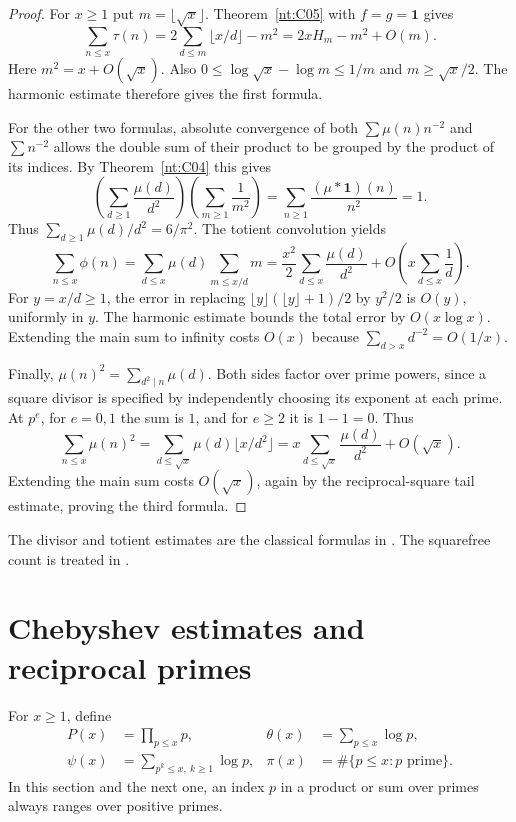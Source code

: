 \documentclass[11pt,oneside,openany]{book}
\theoremstyle{plain}
\theoremstyle{definition}
\theoremstyle{remark}
\begin{document}
\begin{proof}
For \(x\ge1\) put \(m=\lfloor\sqrt{x}\rfloor\). Theorem~\ref{nt:C05}
with \(f=g=\mathbf{1}\) gives
\[
 \sum_{n\le x}\tau(n)=2\sum_{d\le m}\lfloor x/d\rfloor-m^2
                  =2xH_m-m^2+O(m).
\]
Here \(m^2=x+O(\sqrt{x})\). Also
\(0\le\log\sqrt{x}-\log m\le 1/m\) and \(m\ge\sqrt{x}/2\).
The harmonic estimate therefore gives the first formula.

For the other two formulas, absolute convergence of both
\(\sum\mu(n)n^{-2}\) and \(\sum n^{-2}\) allows the double sum
of their product to be grouped by the product of its indices. By
Theorem~\ref{nt:C04} this gives
\[
 \left(\sum_{d\ge1}\frac{\mu(d)}{d^2}\right)
 \left(\sum_{m\ge1}\frac{1}{m^2}\right)
 =\sum_{n\ge1}\frac{(\mu*\mathbf{1})(n)}{n^2}=1 .
\]
Thus \(\sum_{d\ge1}\mu(d)/d^2=6/\pi^2\).
The totient convolution yields
\[
 \sum_{n\le x}\phi(n)
 =\sum_{d\le x}\mu(d)\sum_{m\le x/d}m
 =\frac{x^2}{2}\sum_{d\le x}\frac{\mu(d)}{d^2}
       +O\!\left(x\sum_{d\le x}\frac1d\right).
\]
For \(y=x/d\ge1\), the error in replacing
\(\lfloor y\rfloor(\lfloor y\rfloor+1)/2\) by \(y^2/2\) is \(O(y)\),
uniformly in \(y\). The harmonic estimate bounds the total error by
\(O(x\log x)\). Extending the main sum to infinity costs \(O(x)\)
because \(\sum_{d>x}d^{-2}=O(1/x)\).

Finally, \(\mu(n)^2=\sum_{d^2\mid n}\mu(d)\). Both sides factor over
prime powers, since a square divisor is specified by independently
choosing its exponent at each prime. At \(p^e\), for \(e=0,1\) the
sum is \(1\), and for \(e\ge2\) it is \(1-1=0\). Thus
\[
 \sum_{n\le x}\mu(n)^2
 =\sum_{d\le\sqrt{x}}\mu(d)\lfloor x/d^2\rfloor
 =x\sum_{d\le\sqrt{x}}\frac{\mu(d)}{d^2}+O(\sqrt{x}).
\]
Extending the main sum costs \(O(\sqrt{x})\), again by the
reciprocal-square tail estimate, proving the third formula.
\end{proof}

The divisor and totient estimates are the classical formulas in
\cite[Theorems 3.3 and 3.7]{apostol}. The squarefree count is treated
in \cite[Theorem 8.25]{nzm}.

\section{Chebyshev estimates and reciprocal primes}

For \(x\ge1\), define
\begin{align*}
 P(x)&=\prod_{p\le x}p,
 &\theta(x)&=\sum_{p\le x}\log p,\\
 \psi(x)&=\sum_{p^k\le x,\ k\ge1}\log p,
 &\pi(x)&=\#\{p\le x:p\text{ prime}\}.
\end{align*}
In this section and the next one, an index \(p\) in a product or sum
over primes always ranges over positive primes.
\end{document}
